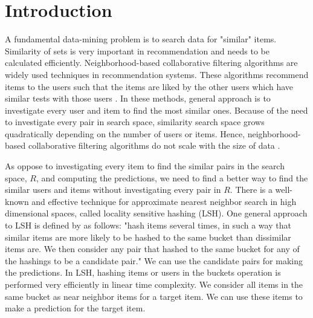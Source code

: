 \documentclass[conference]{IEEEtran}
\begin{document}





%
\IEEEpeerreviewmaketitle


\section{Introduction}

A fundamental data-mining problem is to search data for "similar" items. 
Similarity of sets is very important in recommendation and needs to be
calculated efficiently. Neighborhood-based collaborative filtering 
algorithms are widely used techniques in recommendation systems. These 
algorithms recommend items to the users such that the items are liked by 
the other users which have similar tests with those users \cite{DBLP:journals/ir/HerlockerKR02}. 
In these methods, general approach is to investigate every user and item to find 
the most similar ones. Because of the need to investigate every pair in 
search space, similarity search space grows quadratically depending on the 
number of users or items. Hence, neighborhood-based collaborative 
filtering algorithms do not scale with the size of data \cite {DBLP:reference/rsh/DesrosiersK11}.

As oppose to investigating every item to find the similar pairs in the 
search space, $R$, and computing the predictions, we need to find a better 
way to find the similar users and items without investigating every pair in $R$. 
There is a well-known and effective technique for approximate nearest neighbor 
search in high dimensional spaces, called locality sensitive hashing (LSH). 
One general approach to LSH is defined by \cite{Rajaraman:2011:MMD:2124405} 
as follows: "hash items several times, in such a way that similar items are more likely to 
be hashed to the same bucket than dissimilar items are. We then consider 
any pair that hashed to the same bucket for any of the hashings to be a 
candidate pair." We can use the candidate pairs for making the 
predictions. In LSH, hashing items or users in the buckets operation is 
performed very efficiently in linear time complexity. We consider all 
items in the same bucket as near neighbor items for a target item. 
We can use these items to make a prediction for the target item.
\end{document}
